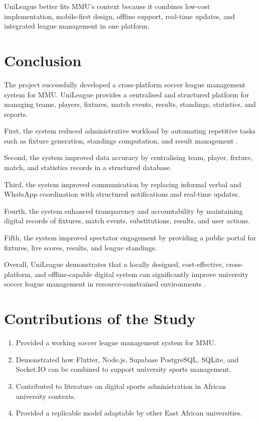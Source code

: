 \documentclass[12pt,a4paper]{report}
\begin{document}
UniLeague better fits MMU's context because it combines low-cost implementation, mobile-first
design, offline support, real-time updates, and integrated league management in one platform.

\section{Conclusion}
The project successfully developed a cross-platform soccer league management system for MMU.
UniLeague provides a centralised and structured platform for managing teams, players, fixtures,
match events, results, standings, statistics, and reports.

First, the system reduced administrative workload by automating repetitive tasks such as
fixture generation, standings computation, and result management \cite{sarlak2024}.

Second, the system improved data accuracy by centralising team, player, fixture, match, and
statistics records in a structured database.

Third, the system improved communication by replacing informal verbal and WhatsApp coordination
with structured notifications and real-time updates.

Fourth, the system enhanced transparency and accountability by maintaining digital records of
fixtures, match events, substitutions, results, and user actions.

Fifth, the system improved spectator engagement by providing a public portal for fixtures,
live scores, results, and league standings.

Overall, UniLeague demonstrates that a locally designed, cost-effective, cross-platform, and
offline-capable digital system can significantly improve university soccer league management
in resource-constrained environments \cite{vec2024}.

\section{Contributions of the Study}
\begin{enumerate}
  \item Provided a working soccer league management system for MMU.
  \item Demonstrated how Flutter, Node.js, Supabase PostgreSQL, SQLite, and Socket.IO can
        be combined to support university sports management.
  \item Contributed to literature on digital sports administration in African university contexts.
  \item Provided a replicable model adaptable by other East African universities.
\end{enumerate}
\end{document}
